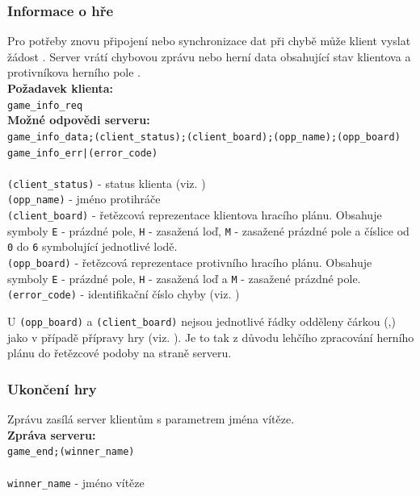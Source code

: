 \documentclass[12pt, a4paper]{article} %
\begin{document}
	\subsubsection{Informace o hře}
	\par Pro potřeby znovu připojení nebo synchronizace dat při chybě může klient vyslat žádost . Server vrátí chybovou zprávu  nebo herní data obsahující stav klientova a protivníkova herního pole .
	\\
	\textbf{Požadavek klienta:}\\
	\texttt{game\_info\_req}\\
	\textbf{Možné odpovědi serveru:}\\
	\texttt{game\_info\_data;(client\_status);(client\_board);(opp\_name);(opp\_board)}\\
	\texttt{game\_info\_err|(error\_code)}\\\\
	\texttt{(client\_status)} - status klienta (viz. )\\
	\texttt{(opp\_name)} - jméno protihráče\\
	\texttt{(client\_board)} - řetězcová reprezentace klientova hracího plánu. Obsahuje symboly \texttt{E} - prázdné pole, \texttt{H} - zasažená loď, \texttt{M} - zasažené prázdné pole a číslice od \texttt{0} do \texttt{6} symbolující jednotlivé lodě.\\
	\texttt{(opp\_board)} - řetězcová reprezentace protivního hracího plánu. Obsahuje symboly \texttt{E} - prázdné pole, \texttt{H} - zasažená loď a \texttt{M} - zasažené prázdné pole.\\
	\texttt{(error\_code)} - identifikační číslo chyby (viz. )
	
	\begin{notes}
	 \item U \texttt{(opp\_board)} a \texttt{(client\_board)} nejsou jednotlivé řádky odděleny čárkou (,) jako v případě přípravy hry (viz. ). Je to tak z důvodu lehčího zpracování herního plánu do řetězcové podoby na straně serveru.
	\end{notes}
	\subsubsection{Ukončení hry}
	\par Zprávu zasílá server klientům s parametrem jména vítěze.\\
	\textbf{Zpráva serveru:}\\
	\texttt{game\_end;(winner\_name)}\\\\
	\texttt{winner\_name} - jméno vítěze
\end{document}
